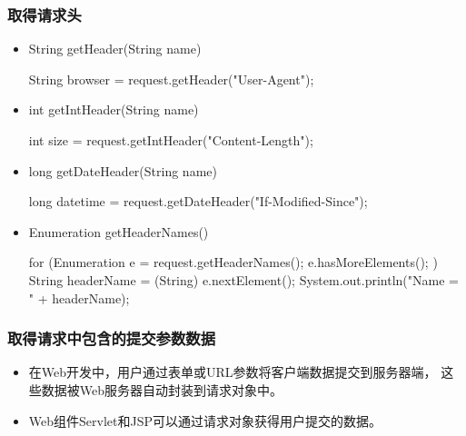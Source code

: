\begin{frame}[fragile] %
  \frametitle{取得请求头} 

  \begin{itemize}
  \item String getHeader(String name)
    \begin{javaCode}
      String browser = request.getHeader("User-Agent");
    \end{javaCode}

  \item int getIntHeader(String name)
    \begin{javaCode}
      int size = request.getIntHeader("Content-Length");
    \end{javaCode}

  \item long getDateHeader(String name)
    \begin{javaCode}
      long datetime = request.getDateHeader("If-Modified-Since");
    \end{javaCode}

  \item Enumeration getHeaderNames()
    
    \begin{javaCode}
      for (Enumeration e = request.getHeaderNames(); e.hasMoreElements(); ) {
        String headerName = (String) e.nextElement();
        System.out.println("Name = " + headerName);
      }
    \end{javaCode}
  \end{itemize}
\end{frame}

\begin{frame} %
  \frametitle{取得请求中包含的提交参数数据} 

  \begin{itemize}
  \item 在Web开发中，用户通过表单或URL参数将客户端数据提交到服务器端，
    这些数据被Web服务器自动封装到请求对象中。
  \item Web组件Servlet和JSP可以通过请求对象获得用户提交的数据。
  \end{itemize}
\end{frame}

